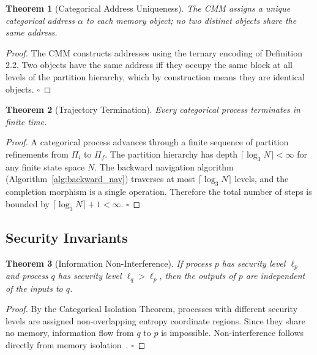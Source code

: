 \documentclass[12pt,twocolumn]{article}
\newtheorem{theorem}{Theorem}[section]
\begin{document}
\begin{theorem}[Categorical Address Uniqueness]
\label{thm:addr_unique}
The CMM assigns a unique categorical address $\alpha$ to each memory object; no two distinct objects share the same address.
\end{theorem}

\begin{proof}
The CMM constructs addresses using the ternary encoding of Definition 2.2. Two objects have the same address iff they occupy the same block at all levels of the partition hierarchy, which by construction means they are identical objects. $\square$
\end{proof}

\begin{theorem}[Trajectory Termination]
\label{thm:termination}
Every categorical process terminates in finite time.
\end{theorem}

\begin{proof}
A categorical process advances through a finite sequence of partition refinements from $\Pi_i$ to $\Pi_f$. The partition hierarchy has depth $\lceil \log_3 N \rceil < \infty$ for any finite state space $N$. The backward navigation algorithm (Algorithm~\ref{alg:backward_nav}) traverses at most $\lceil \log_3 N \rceil$ levels, and the completion morphism is a single operation. Therefore the total number of steps is bounded by $\lceil \log_3 N \rceil + 1 < \infty$. $\square$
\end{proof}

\subsection{Security Invariants}

\begin{theorem}[Information Non-Interference]
If process $p$ has security level $\ell_p$ and process $q$ has security level $\ell_q > \ell_p$, then the outputs of $p$ are independent of the inputs to $q$.
\end{theorem}

\begin{proof}
By the Categorical Isolation Theorem, processes with different security levels are assigned non-overlapping entropy coordinate regions. Since they share no memory, information flow from $q$ to $p$ is impossible. Non-interference follows directly from memory isolation~\cite{lamport1977proving}. $\square$
\end{proof}
\end{document}
